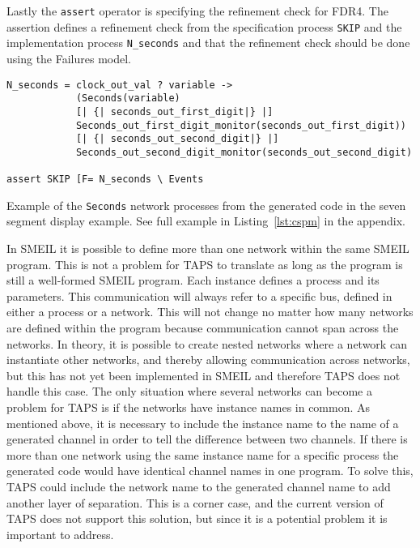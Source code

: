 Lastly the \cspm{} \texttt{assert} operator is specifying the refinement check for FDR4. The assertion defines a refinement check from the specification process \texttt{SKIP} and the implementation process \texttt{N\_seconds} and that the refinement check should be done using the Failures model.\\
\begin{listing}
\begin{verbatim}
N_seconds = clock_out_val ? variable ->
            (Seconds(variable)
            [| {| seconds_out_first_digit|} |]
            Seconds_out_first_digit_monitor(seconds_out_first_digit))
            [| {| seconds_out_second_digit|} |]
            Seconds_out_second_digit_monitor(seconds_out_second_digit)

assert SKIP [F= N_seconds \ Events
\end{verbatim}
\caption{Example of the \texttt{Seconds} network processes from the generated \cspm{} code in the seven segment display example. See full example in Listing~\ref{lst:cspm} in the appendix.}
\label{lst:network_example_cspm}
\end{listing}

In SMEIL it is possible to define more than one network within the same SMEIL program. This is not a problem for TAPS to translate as long as the program is still a well-formed SMEIL program. Each instance defines a process and its parameters. This communication will always refer to a specific bus, defined in either a process or a network. This will not change no matter how many networks are defined within the program because communication cannot span across the networks.
In theory, it is possible to create nested networks where a network can instantiate other networks, and thereby allowing communication across networks, but this has not yet been implemented in SMEIL and therefore TAPS does not handle this case.
The only situation where several networks can become a problem for TAPS is if the networks have instance names in common. As mentioned above, it is necessary to include the instance name to the name of a generated \cspm{} channel in order to tell the difference between two \cspm{} channels. If there is more than one network using the same instance name for a specific process the generated code would have identical channel names in one \cspm{} program. To solve this, TAPS could include the network name to the generated \cspm{} channel name to add another layer of separation. This is a corner case, and the current version of TAPS does not support this solution, but since it is a potential problem it is important to address.

